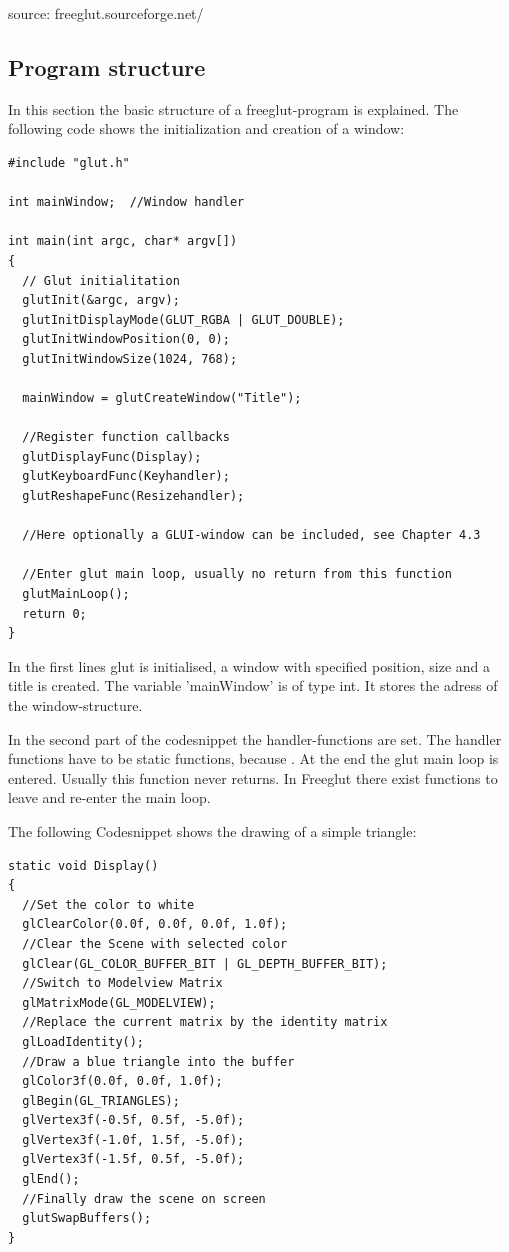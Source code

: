\documentclass[10pt,a4paper,DIV=11]{scrreprt}
\begin{document}
source: freeglut.sourceforge.net/

\subsection{Program structure}
In this section the basic structure of a freeglut-program is explained.
The following code shows the initialization and creation of a window:

\begin{lstlisting}[caption={Initialization a GLUT-program},label=lst:glut-init]
#include "glut.h"

int mainWindow;  //Window handler

int main(int argc, char* argv[])
{
  // Glut initialitation
  glutInit(&argc, argv);
  glutInitDisplayMode(GLUT_RGBA | GLUT_DOUBLE);
  glutInitWindowPosition(0, 0); 
  glutInitWindowSize(1024, 768);
  
  mainWindow = glutCreateWindow("Title");
  
  //Register function callbacks
  glutDisplayFunc(Display);
  glutKeyboardFunc(Keyhandler);
  glutReshapeFunc(Resizehandler);
  
  //Here optionally a GLUI-window can be included, see Chapter 4.3
  
  //Enter glut main loop, usually no return from this function
  glutMainLoop(); 
  return 0;
}
\end{lstlisting}

In the first lines glut is initialised, a window with specified position, size and a title is created.
The variable 'mainWindow' is of type int. It stores the adress of the window-structure.

In the second part of the codesnippet the handler-functions are set. The handler functions have to be static functions, because .
At the end the glut main loop is entered. Usually this function never returns. In Freeglut there exist functions to leave and re-enter the main loop.

The following Codesnippet shows the drawing of a simple triangle:

\begin{lstlisting}[caption={Drawing some graphics},label=lst:glut-draw]
static void Display()
{
  //Set the color to white
  glClearColor(0.0f, 0.0f, 0.0f, 1.0f);
  //Clear the Scene with selected color
  glClear(GL_COLOR_BUFFER_BIT | GL_DEPTH_BUFFER_BIT);
  //Switch to Modelview Matrix
  glMatrixMode(GL_MODELVIEW);
  //Replace the current matrix by the identity matrix
  glLoadIdentity();
  //Draw a blue triangle into the buffer
  glColor3f(0.0f, 0.0f, 1.0f);
  glBegin(GL_TRIANGLES);
  glVertex3f(-0.5f, 0.5f, -5.0f);
  glVertex3f(-1.0f, 1.5f, -5.0f);
  glVertex3f(-1.5f, 0.5f, -5.0f);
  glEnd();
  //Finally draw the scene on screen
  glutSwapBuffers();
}
\end{lstlisting}
\end{document}
